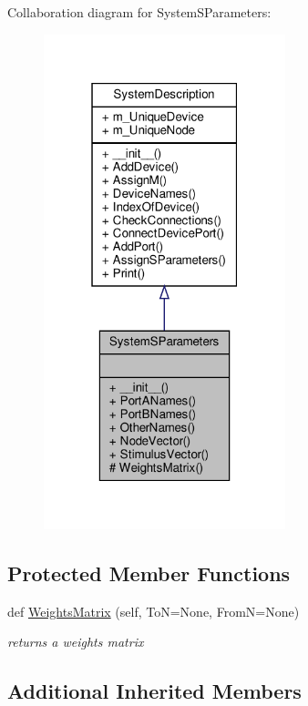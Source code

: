 Collaboration diagram for System\+S\+Parameters\+:\nopagebreak
\begin{figure}[H]
\begin{center}
\leavevmode
\includegraphics[width=199pt]{classSignalIntegrity_1_1SystemDescriptions_1_1SystemSParameters_1_1SystemSParameters__coll__graph}
\end{center}
\end{figure}
\subsection*{Protected Member Functions}
\begin{DoxyCompactItemize}
\item 
def \hyperlink{classSignalIntegrity_1_1SystemDescriptions_1_1SystemSParameters_1_1SystemSParameters_a60ce3b270f6f66dd0e2fb9f64629f8e6}{Weights\+Matrix} (self, ToN=None, FromN=None)
\begin{DoxyCompactList}\small\item\em returns a weights matrix \end{DoxyCompactList}\end{DoxyCompactItemize}
\subsection*{Additional Inherited Members}


